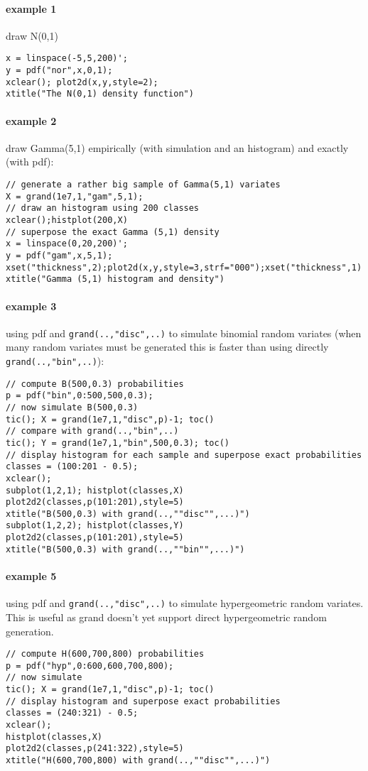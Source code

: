 \begin{examples}
  
\paragraph{example 1} draw N(0,1) 
\begin{Verbatim}
x = linspace(-5,5,200)';
y = pdf("nor",x,0,1);
xclear(); plot2d(x,y,style=2);
xtitle("The N(0,1) density function")
\end{Verbatim}
  
\paragraph{example 2} draw Gamma(5,1) empirically (with simulation and
an histogram) and exactly (with pdf):
\begin{Verbatim}
// generate a rather big sample of Gamma(5,1) variates
X = grand(1e7,1,"gam",5,1);
// draw an histogram using 200 classes
xclear();histplot(200,X)
// superpose the exact Gamma (5,1) density
x = linspace(0,20,200)';
y = pdf("gam",x,5,1);
xset("thickness",2);plot2d(x,y,style=3,strf="000");xset("thickness",1)
xtitle("Gamma (5,1) histogram and density")
\end{Verbatim}

\paragraph{example 3} using pdf and \verb+grand(..,"disc",..)+ to simulate
binomial random variates (when many random variates must be generated
this is faster than using directly \verb+grand(..,"bin",..)+):
\begin{Verbatim}
// compute B(500,0.3) probabilities
p = pdf("bin",0:500,500,0.3);
// now simulate B(500,0.3)
tic(); X = grand(1e7,1,"disc",p)-1; toc()
// compare with grand(..,"bin",..)
tic(); Y = grand(1e7,1,"bin",500,0.3); toc()
// display histogram for each sample and superpose exact probabilities
classes = (100:201 - 0.5);
xclear();
subplot(1,2,1); histplot(classes,X)
plot2d2(classes,p(101:201),style=5)
xtitle("B(500,0.3) with grand(..,""disc"",...)")
subplot(1,2,2); histplot(classes,Y)
plot2d2(classes,p(101:201),style=5)
xtitle("B(500,0.3) with grand(..,""bin"",...)")
\end{Verbatim}

\paragraph{example 5} using pdf and \verb+grand(..,"disc",..)+ to simulate
hypergeometric random variates. This is useful as grand doesn't yet
support direct hypergeometric random generation.
\begin{Verbatim}
// compute H(600,700,800) probabilities
p = pdf("hyp",0:600,600,700,800);
// now simulate 
tic(); X = grand(1e7,1,"disc",p)-1; toc()
// display histogram and superpose exact probabilities
classes = (240:321) - 0.5;
xclear();
histplot(classes,X)
plot2d2(classes,p(241:322),style=5)
xtitle("H(600,700,800) with grand(..,""disc"",...)")
\end{Verbatim}

\end{examples}
